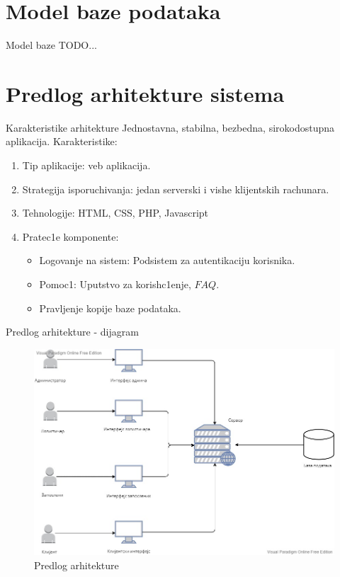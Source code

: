 \documentclass[11pt]{beamer}
\begin{document}
\section{Model baze podataka}
\begin{frame}{Model baze}
TODO...
\end{frame}

\section{Predlog arhitekture sistema}
\begin{frame}{Karakteristike arhitekture}
 Jednostavna, stabilna, bezbedna, sirokodostupna aplikacija.
Karakteristike:
\begin{enumerate}
    \item Tip aplikacije: veb aplikacija.
    \item Strategija isporuchivanja: jedan serverski i vishe klijentskih rachunara.
    \item Tehnologije: HTML, CSS, PHP, Javascript
    \item Pratec1e komponente:
    \begin{itemize}
        \item Logovanje na sistem: Podsistem za autentikaciju korisnika.
        \item Pomoc1: Uputstvo za korish\-c1enje, $FAQ.$
        \item Pravljenje kopije baze podataka.
    \end{itemize}
    
\end{enumerate}
\end{frame}
\begin{frame}{Predlog arhitekture - dijagram}
 \begin{figure}
     \centering
     \includegraphics[scale=0.25]{Slike/Arhitektura/arhitektura .jpg}
     \caption{Predlog arhitekture}
 \end{figure}
 \end{frame}
\end{document}
